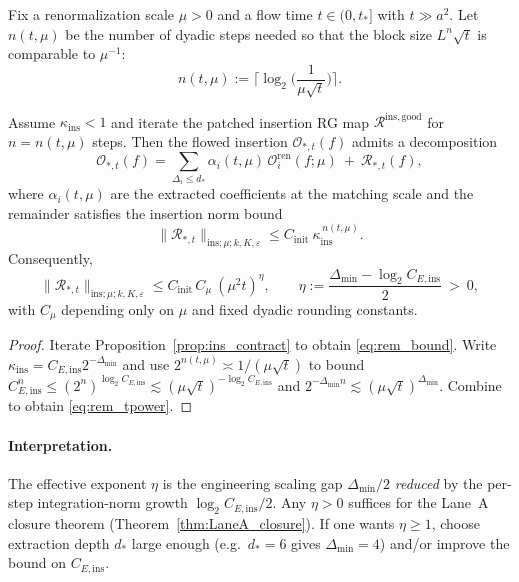 Fix a renormalization scale $\mu>0$ and a flow time $t\in(0,t_\ast]$ with $t\gg a^2$.
Let $n(t,\mu)$ be the number of dyadic steps needed so that the block size $L^{n}\sqrt t$ is comparable to $\mu^{-1}$:
\begin{equation}\label{eq:n_def}
n(t,\mu):=\Big\lceil \log_2\Big(\frac{1}{\mu\sqrt t}\Big)\Big\rceil.
\end{equation}

\begin{theorem}\label{thm:ins_decomp}
Assume $\kappa_{\mathrm{ins}}<1$ and iterate the patched insertion RG map $\mathcal R^{\mathrm{ins,good}}$ for $n=n(t,\mu)$ steps.
Then the flowed insertion $\mathcal O_{*,t}(f)$ admits a decomposition
\[
\mathcal O_{*,t}(f)=\sum_{\Delta_i\le d_\ast}\alpha_i(t,\mu)\,\mathcal O_i^{\mathrm{ren}}(f;\mu)\ +\ \mathcal R_{*,t}(f),
\]
where $\alpha_i(t,\mu)$ are the extracted coefficients at the matching scale and the remainder satisfies the insertion norm bound
\begin{equation}\label{eq:rem_bound}
\|\mathcal R_{*,t}\|_{\mathrm{ins};\mu;k,K,\varepsilon}
\le C_{\mathrm{init}}\ \kappa_{\mathrm{ins}}^{\,n(t,\mu)}.
\end{equation}
Consequently,
\begin{equation}\label{eq:rem_tpower}
\|\mathcal R_{*,t}\|_{\mathrm{ins};\mu;k,K,\varepsilon}
\le C_{\mathrm{init}}\,C_\mu\ (\mu^2 t)^{\eta},
\qquad
\eta:=\frac{\Delta_{\min}-\log_2 C_{E,\mathrm{ins}}}{2}\ >\ 0,
\end{equation}
with $C_\mu$ depending only on $\mu$ and fixed dyadic rounding constants.
\end{theorem}

\begin{proof}
Iterate Proposition~\ref{prop:ins_contract} to obtain \eqref{eq:rem_bound}.
Write $\kappa_{\mathrm{ins}}=C_{E,\mathrm{ins}}2^{-\Delta_{\min}}$ and use $2^{n(t,\mu)}\asymp 1/(\mu\sqrt t)$ to bound
$C_{E,\mathrm{ins}}^{n}\le (2^{n})^{\log_2 C_{E,\mathrm{ins}}}\lesssim (\mu\sqrt t)^{-\log_2 C_{E,\mathrm{ins}}}$ and
$2^{-\Delta_{\min}n}\lesssim (\mu\sqrt t)^{\Delta_{\min}}$.
Combine to obtain \eqref{eq:rem_tpower}.
\end{proof}

\paragraph{Interpretation.}
The effective exponent $\eta$ is the engineering scaling gap $\Delta_{\min}/2$ \emph{reduced} by the per-step integration-norm growth $\log_2 C_{E,\mathrm{ins}}/2$.
Any $\eta>0$ suffices for the Lane~A closure theorem (Theorem~\ref{thm:LaneA_closure}). If one wants $\eta\ge 1$, choose extraction depth $d_\ast$ large enough (e.g.\ $d_\ast=6$ gives $\Delta_{\min}=4$)
and/or improve the bound on $C_{E,\mathrm{ins}}$.

